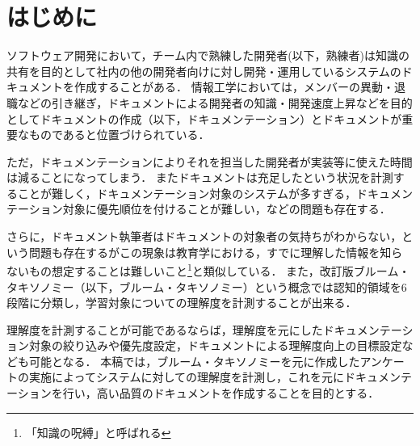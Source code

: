 \section{はじめに}
ソフトウェア開発において，チーム内で熟練した開発者(以下，熟練者)は知識の共有を目的として社内の他の開発者向けに対し開発・運用しているシステムのドキュメントを作成することがある．
情報工学においては，メンバーの異動・退職などの引き継ぎ，ドキュメントによる開発者の知識・開発速度上昇などを目的としてドキュメントの作成（以下，ドキュメンテーション）とドキュメントが重要なものであると位置づけられている．\cite{bib:ozawa}

ただ，ドキュメンテーションによりそれを担当した開発者が実装等に使えた時間は減ることになってしまう．
またドキュメントは充足したという状況を計測することが難しく，ドキュメンテーション対象のシステムが多すぎる，ドキュメンテーション対象に優先順位を付けることが難しい，などの問題も存在する．

さらに，ドキュメント執筆者はドキュメントの対象者の気持ちがわからない，という問題も存在するがこの現象は教育学における，すでに理解した情報を知らないもの想定することは難しいこと\footnote{「知識の呪縛」と呼ばれる}\cite{bib:kaneda}と類似している．
また，改訂版ブルーム・タキソノミー（以下，ブルーム・タキソノミー）という概念では認知的領域を6段階に分類し，学習対象についての理解度を計測することが出来る．

理解度を計測することが可能であるならば，理解度を元にしたドキュメンテーション対象の絞り込みや優先度設定，ドキュメントによる理解度向上の目標設定なども可能となる．
本稿では，ブルーム・タキソノミーを元に作成したアンケートの実施によってシステムに対しての理解度を計測し，これを元にドキュメンテーションを行い，高い品質のドキュメントを作成することを目的とする．

